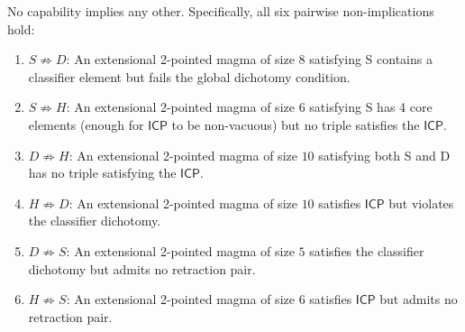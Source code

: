 \documentclass[sigconf,screen,review,anonymous]{acmart}
\newcommand{\ICP}{\textsf{ICP}}
\begin{document}
\begin{theorem}
\label{thm:independence}
No capability implies any other. Specifically, all six pairwise non-implications hold:
\begin{enumerate}
  \item $S \not\Rightarrow D$: An extensional 2-pointed magma of size $8$ satisfying S contains a classifier element but fails the global dichotomy condition.
  \item $S \not\Rightarrow H$: An extensional 2-pointed magma of size $6$ satisfying S has 4 core elements (enough for $\ICP$ to be non-vacuous) but no triple satisfies the $\ICP$.
  \item $D \not\Rightarrow H$: An extensional 2-pointed magma of size $10$ satisfying both S and D has no triple satisfying the $\ICP$.
  \item $H \not\Rightarrow D$: An extensional 2-pointed magma of size $10$ satisfies $\ICP$ but violates the classifier dichotomy.
  \item $D \not\Rightarrow S$: An extensional 2-pointed magma of size $5$ satisfies the classifier dichotomy but admits no retraction pair.
  \item $H \not\Rightarrow S$: An extensional 2-pointed magma of size $6$ satisfies $\ICP$ but admits no retraction pair.
\end{enumerate}
\end{theorem}
\end{document}
